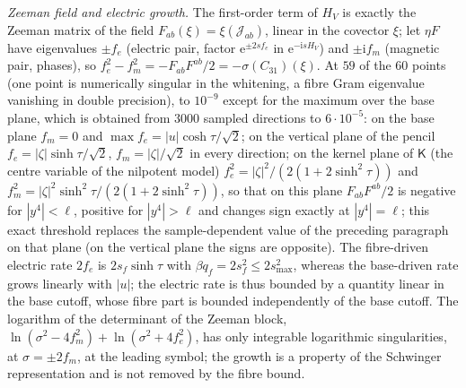 \emph{Zeeman field and electric growth.} The first-order term of \(H_V\) is exactly the Zeeman matrix of the field \(F_{ab}(\xi)=\xi(\mathcal J_{ab})\), linear in the covector \(\xi\); let \(\eta F\) have eigenvalues \(\pm f_e\) (electric pair, factor \(\mathrm e^{\pm2sf_e}\) in \(\mathrm e^{-\mathrm isH_V}\)) and \(\pm\mathrm if_m\) (magnetic pair, phases), so \(f_e^2-f_m^2=-F_{ab}F^{ab}/2=-\sigma(C_{31})(\xi)\). At \(59\) of the \(60\) points (one point is numerically singular in the whitening, a fibre Gram eigenvalue vanishing in double precision), to \(10^{-9}\) except for the maximum over the base plane, which is obtained from \(3000\) sampled directions to \(6\cdot10^{-5}\): on the base plane \(f_m=0\) and \(\max f_e=|u|\cosh\tau/\sqrt2\); on the vertical plane of the pencil \(f_e=|\zeta|\sinh\tau/\sqrt2\), \(f_m=|\zeta|/\sqrt2\) in every direction; on the kernel plane of \(\mathsf K\) (the centre variable of the nilpotent model) \(f_e^2=|\zeta|^2/(2(1+2\sinh^2\tau))\) and \(f_m^2=|\zeta|^2\sinh^2\tau/(2(1+2\sinh^2\tau))\), so that on this plane \(F_{ab}F^{ab}/2\) is negative for \(|y^4|<\ell\), positive for \(|y^4|>\ell\) and changes sign exactly at \(|y^4|=\ell\); this exact threshold replaces the sample-dependent value of the preceding paragraph on that plane (on the vertical plane the signs are opposite). The fibre-driven electric rate \(2f_e\) is \(2s_f\sinh\tau\) with \(\beta q_f=2s_f^2\le2s_{\max}^2\), whereas the base-driven rate grows linearly with \(|u|\); the electric rate is thus bounded by a quantity linear in the base cutoff, whose fibre part is bounded independently of the base cutoff. The logarithm of the determinant of the Zeeman block, \(\ln(\sigma^2-4f_m^2)+\ln(\sigma^2+4f_e^2)\), has only integrable logarithmic singularities, at \(\sigma=\pm2f_m\), at the leading symbol; the growth is a property of the Schwinger representation and is not removed by the fibre bound.

